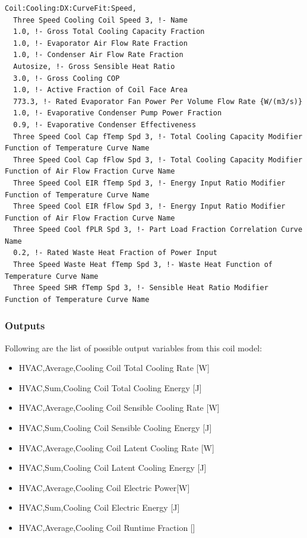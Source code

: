 \begin{lstlisting}
Coil:Cooling:DX:CurveFit:Speed,
  Three Speed Cooling Coil Speed 3, !- Name
  1.0, !- Gross Total Cooling Capacity Fraction
  1.0, !- Evaporator Air Flow Rate Fraction
  1.0, !- Condenser Air Flow Rate Fraction
  Autosize, !- Gross Sensible Heat Ratio
  3.0, !- Gross Cooling COP
  1.0, !- Active Fraction of Coil Face Area
  773.3, !- Rated Evaporator Fan Power Per Volume Flow Rate {W/(m3/s)}
  1.0, !- Evaporative Condenser Pump Power Fraction
  0.9, !- Evaporative Condenser Effectiveness
  Three Speed Cool Cap fTemp Spd 3, !- Total Cooling Capacity Modifier Function of Temperature Curve Name
  Three Speed Cool Cap fFlow Spd 3, !- Total Cooling Capacity Modifier Function of Air Flow Fraction Curve Name
  Three Speed Cool EIR fTemp Spd 3, !- Energy Input Ratio Modifier Function of Temperature Curve Name
  Three Speed Cool EIR fFlow Spd 3, !- Energy Input Ratio Modifier Function of Air Flow Fraction Curve Name
  Three Speed Cool fPLR Spd 3, !- Part Load Fraction Correlation Curve Name
  0.2, !- Rated Waste Heat Fraction of Power Input
  Three Speed Waste Heat fTemp Spd 3, !- Waste Heat Function of Temperature Curve Name
  Three Speed SHR fTemp Spd 3, !- Sensible Heat Ratio Modifier Function of Temperature Curve Name

\end{lstlisting}

\subsubsection{Outputs}\label{outputs-01}

Following are the list of possible output variables from this coil model:

\begin{itemize}
\item
  HVAC,Average,Cooling Coil Total Cooling Rate {[}W{]}
\item
  HVAC,Sum,Cooling Coil Total Cooling Energy {[}J{]}
\item
  HVAC,Average,Cooling Coil Sensible Cooling Rate {[}W{]}
\item
  HVAC,Sum,Cooling Coil Sensible Cooling Energy {[}J{]}
\item
  HVAC,Average,Cooling Coil Latent Cooling Rate {[}W{]}
\item
  HVAC,Sum,Cooling Coil Latent Cooling Energy {[}J{]}
\item
  HVAC,Average,Cooling Coil Electric Power{[}W{]}
\item
  HVAC,Sum,Cooling Coil Electric Energy {[}J{]}
\item
  HVAC,Average,Cooling Coil Runtime Fraction {[]}
\end{itemize}


